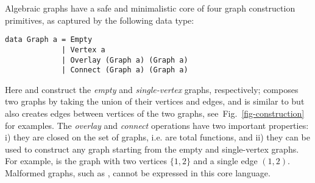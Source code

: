 Algebraic graphs have a safe and minimalistic core of four graph construction primitives,
as captured by the following data type:

\begin{verbatim}
data Graph a = Empty
             | Vertex a
             | Overlay (Graph a) (Graph a)
             | Connect (Graph a) (Graph a)
\end{verbatim}

\noindent
Here  and  construct the \emph{empty} and \emph{single-vertex} graphs,
respectively;  composes two graphs by taking the union of their vertices and
edges, and  is similar to  but also creates edges between vertices
of the two graphs, see~Fig.~\ref{fig-construction} for examples. The \emph{overlay} and
\emph{connect} operations have two important properties:
i) they are closed on the set of graphs, i.e. are total functions, and ii) they can be used
to construct any graph starting from the empty and single-vertex graphs.
For example,  is the graph with two vertices $\{1,2\}$
and a single edge $(1,2)$. Malformed graphs, such as , cannot be
expressed in this core language.

